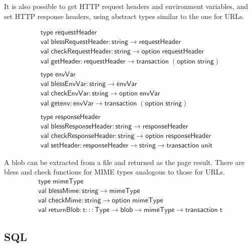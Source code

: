 \documentclass{article}
\newcommand{\mt}[1]{\mathsf{#1}}
\begin{document}
It is also possible to get HTTP request headers and environment variables, and set HTTP response headers, using abstract types similar to the one for URLs.

$$\begin{array}{l}
  \mt{type} \; \mt{requestHeader} \\
  \mt{val} \; \mt{blessRequestHeader} : \mt{string} \to \mt{requestHeader} \\
  \mt{val} \; \mt{checkRequestHeader} : \mt{string} \to \mt{option} \; \mt{requestHeader} \\
  \mt{val} \; \mt{getHeader} : \mt{requestHeader} \to \mt{transaction} \; (\mt{option} \; \mt{string}) \\
  \\
  \mt{type} \; \mt{envVar} \\
  \mt{val} \; \mt{blessEnvVar} : \mt{string} \to \mt{envVar} \\
  \mt{val} \; \mt{checkEnvVar} : \mt{string} \to \mt{option} \; \mt{envVar} \\
  \mt{val} \; \mt{getenv} : \mt{envVar} \to \mt{transaction} \; (\mt{option} \; \mt{string}) \\
  \\
  \mt{type} \; \mt{responseHeader} \\
  \mt{val} \; \mt{blessResponseHeader} : \mt{string} \to \mt{responseHeader} \\
  \mt{val} \; \mt{checkResponseHeader} : \mt{string} \to \mt{option} \; \mt{responseHeader} \\
  \mt{val} \; \mt{setHeader} : \mt{responseHeader} \to \mt{string} \to \mt{transaction} \; \mt{unit}
\end{array}$$

A blob can be extracted from a file and returned as the page result.  There are bless and check functions for MIME types analogous to those for URLs.
$$\begin{array}{l}
  \mt{type} \; \mt{mimeType} \\
  \mt{val} \; \mt{blessMime} : \mt{string} \to \mt{mimeType} \\
  \mt{val} \; \mt{checkMime} : \mt{string} \to \mt{option} \; \mt{mimeType} \\
  \mt{val} \; \mt{returnBlob} : \mt{t} ::: \mt{Type} \to \mt{blob} \to \mt{mimeType} \to \mt{transaction} \; \mt{t}
\end{array}$$


\subsection{SQL}
\end{document}
